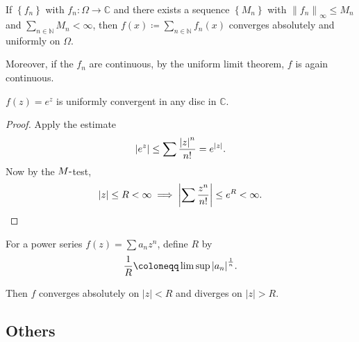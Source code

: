 \begin{theorem}

If \(\left\{{f_n}\right\}\) with \(f_n: \Omega \to {\mathbb{C}}\) and
there exists a sequence \(\left\{{M_n}\right\}\) with
\({\left\lVert {f_n} \right\rVert}_\infty \leq M_n\) and
\(\sum_{n\in {\mathbb{N}}} M_n < \infty\), then
\(f(x) \coloneqq\sum_{n\in {\mathbb{N}}} f_n(x)\) converges absolutely
and uniformly on \(\Omega\).

Moreover, if the \(f_n\) are continuous, by the uniform limit theorem,
\(f\) is again continuous.

\end{theorem}

\begin{proposition}

\(f(z) = e^z\) is uniformly convergent in any disc in \({\mathbb{C}}\).

\end{proposition}

\begin{proof}

Apply the estimate
\begin{align*}  
{\left\lvert {e^z} \right\rvert} \leq \sum {{\left\lvert {z} \right\rvert}^n \over n!} = e^{{\left\lvert {z} \right\rvert}}
.\end{align*}
Now by the \(M{\hbox{-}}\)test,
\begin{align*}  
{\left\lvert {z} \right\rvert} \leq R < \infty \implies {\left\lvert {\sum {z^n \over n!}} \right\rvert} \leq e^R < \infty
.\end{align*}

\end{proof}

\begin{proposition}

For a power series \(f(z) = \sum a_n z^n\), define \(R\) by
\begin{align*}  
{1\over R}\coloneqq\limsup {\left\lvert {a_n} \right\rvert}^{1\over n}
.\end{align*}

Then \(f\) converges absolutely on
\({\left\lvert {z} \right\rvert} < R\) and diverges on
\({\left\lvert {z} \right\rvert} > R\).

\end{proposition}

\hypertarget{others-1}{%
\subsection{Others}\label{others-1}}

